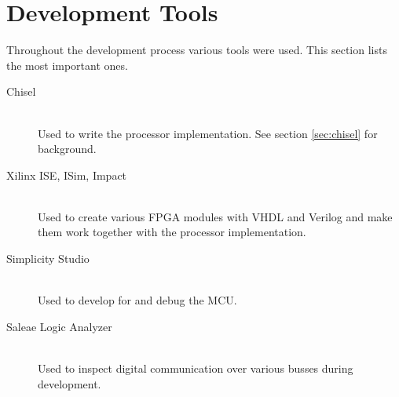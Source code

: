 \section{Development Tools}
Throughout the development process various tools were used.
This section lists the most important ones.

\begin{description}
    \item[Chisel]
    \hfill\\
    Used to write the processor implementation.
    See section \ref{sec:chisel} for background.
    \item[Xilinx ISE, ISim, Impact]
    \hfill\\
    Used to create various FPGA modules with VHDL and Verilog and make them work together with the processor implementation.
    \item[Simplicity Studio]
    \hfill\\
    Used to develop for and debug the MCU.
    \item[Saleae Logic Analyzer]
    \hfill\\
    Used to inspect digital communication over various busses during development.
\end{description}

